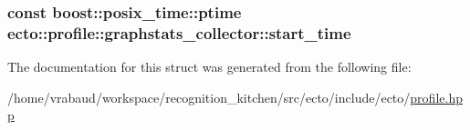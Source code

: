 \subsubsection[{start\+\_\+time}]{\setlength{\rightskip}{0pt plus 5cm}const boost\+::posix\+\_\+time\+::ptime ecto\+::profile\+::graphstats\+\_\+collector\+::start\+\_\+time}\label{structecto_1_1profile_1_1graphstats__collector_a85cb67d72c9d1072634b879776e2e4b8}


The documentation for this struct was generated from the following file\+:\begin{DoxyCompactItemize}
\item 
/home/vrabaud/workspace/recognition\+\_\+kitchen/src/ecto/include/ecto/\hyperlink{profile_8hpp}{profile.\+hpp}\end{DoxyCompactItemize}
